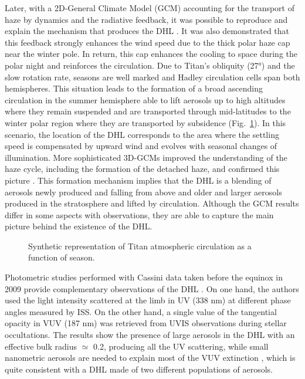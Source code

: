 Later, with a 2D-General Climate Model (GCM) accounting for the transport of haze by dynamics and the radiative
feedback, it was possible to reproduce and explain the mechanism that produces the DHL \citep{Rannou2002}. It was also
demonstrated that this feedback strongly enhances the wind speed due to the thick polar haze cap near the winter pole.
In return, this cap enhances the cooling to space during the polar night \citep{Rannou2004} and
reinforces the circulation. Due to Titan's obliquity (\ang{27}) and the slow rotation rate, seasons are well
marked and Hadley circulation cells span both hemispheres. This situation leads to the formation of a
broad ascending circulation in the summer hemisphere able to lift aerosols up to high altitudes where they remain
suspended and are transported through mid-latitudes to the winter polar region where they are transported by
subsidence (Fig.~\ref{fig:titan_atm_circulation}). In this scenario, the location of the DHL corresponds to the area
where the settling speed is compensated by upward wind and evolves with seasonal changes of illumination.
More sophisticated 3D-GCMs improved the understanding of the haze cycle, including the formation of the detached haze,
and confirmed this picture \citep{Lebonnois2012,Larson2015}. This formation mechanism implies that the DHL
is a blending of aerosols newly produced and falling from above and older and larger aerosols produced in the
stratosphere and lifted by circulation.
Although the GCM results differ in some aspects with observations, they are able to capture the main picture behind
the existence of the DHL.

\begin{figure}[ht!]
\caption{Synthetic representation of Titan atmospheric circulation as a function of season.}
\label{fig:titan_atm_circulation}
\end{figure}

Photometric studies performed with Cassini data taken before the equinox in 2009 provide complementary observations
of the DHL \citep{Cours2011, Koskinen2011, Seignovert2017}.
On one hand, the authors used the light intensity scattered at the limb in UV (338 nm)
at different phase angles measured by ISS. On the other hand, a single value of the tangential opacity in VUV (187 nm)
was retrieved from UVIS observations during stellar occultations.
The results show the presence of large aerosols in the DHL with an effective bulk radius $\simeq$ 0.2\micron,
producing all the UV scattering, while small nanometric aerosols are needed to explain most of the VUV
extinction \citep{Cours2011}, which is quite consistent with a DHL made of two different populations of
aerosols.

